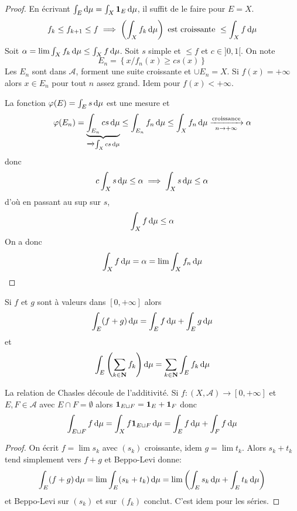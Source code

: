 \begin{proof}
    En écrivant $\int_E\mathop{}\!\mathrm d\mu=\int_X\bm{1}_E\mathop{}\!\mathrm d\mu$, il suffit de le faire pour  $E=X$.  \[
        f_k\leq f_{k+1}\leq f \implies \left( \int_X f_k\mathop{}\!\mathrm d\mu \right) \text{ est croissante  } \leq \int_Xf\mathop{}\!\mathrm d\mu
    \] 
    Soit $\alpha=\lim\int_Xf_k\mathop{}\!\mathrm d \mu\leq \int_X f\mathop{}\!\mathrm d \mu$. Soit $s$ simple et  $\leq f$ et $c \in  ]0,1[$. On note \[
        E_n = \left\{ x / f_n(x)\geq cs(x) \right\} 
    \] 
    Les $E_n$ sont dans  $\mathcal  A$, forment une suite croissante et $\cup E_n=X$. Si  $f(x)=+\infty$ alors $x \in  E_n$ pour tout $n$ assez grand. Idem pour $f(x)<+\infty$.

    La fonction  $\varphi(E)=\int_E s\mathop{}\!\mathrm d\mu$ est une mesure et  \[
        \varphi(E_n)=\underbrace{\int_{E_n}cs\mathop{}\!\mathrm d\mu}_{\xrightarrow{}\int_Xcs\mathop{}\!\mathrm d\mu}\leq \int_{E_n}f_n\mathop{}\!\mathrm d\mu\leq \int_X f_n\mathop{}\!\mathrm d\mu \xrightarrow[n\to +\infty]{\text{croissance}}\alpha
    \] 
    donc \[
    c\int_Xs\mathop{}\!\mathrm d \mu\leq \alpha \implies \int_Xs\mathop{}\!\mathrm d \mu\leq \alpha
    \]
    d'où en passant au sup sur $s$,  \[
    \int_Xf\mathop{}\!\mathrm d\mu\leq \alpha
    \]
    On a donc \[
    \int_Xf\mathop{}\!\mathrm d\mu = \alpha =\lim \int_X f_n\mathop{}\!\mathrm d\mu
    \] 
\end{proof}

\begin{cor}
    Si $f$ et  $g$ sont à valeurs dans  $[0, +\infty]$ alors  \[
        \int_E(f+g)\mathop{}\!\mathrm d \mu=\int_Ef\mathop{}\!\mathrm d\mu+\int_E g\mathop{}\!\mathrm d\mu
    \] 
    et \[
        \int_E \left(\sum_{k \in  \mathbf N} f_k\right)\mathop{}\!\mathrm d\mu=\sum_{k \in  \mathbf N}\int_Ef_k\mathop{}\!\mathrm d\mu
    \] 
\end{cor}

\begin{rem}
    La relation de Chasles découle de l'additivité. Si $f:(X, \mathcal  A) \longrightarrow [0, +\infty]$ et $E, F \in  \mathcal  A$ avec $E\cap F=\emptyset$ alors $\bm{1}_{E\sqcup F}=\bm{1}_E+\bm{1}_F$ donc \[
        \int_{E\sqcup F} f\mathop{}\!\mathrm d \mu=\int_X f\bm{1}_{E\sqcup F}\mathop{}\!\mathrm d \mu=\int_Ef\mathop{}\!\mathrm d \mu+\int_Ff\mathop{}\!\mathrm d\mu
    \]
\end{rem}

\begin{proof}
    On écrit $f=\lim s_k$ avec  $(s_k)$ croissante, idem $g=\lim t_k$.  Alors $s_k+t_k$ tend simplement vers  $f+g$ et Beppo-Levi donne:  \[
        \int_E(f+g)\mathop{}\!\mathrm d\mu=\lim\int_E(s_k+t_k)\mathop{}\!\mathrm d\mu=\lim \left(\int_Es_k\mathop{}\!\mathrm d \mu+\int_Et_k\mathop{}\!\mathrm d\mu\right)
    \] 
    et Beppo-Levi sur $(s_k)$ et sur  $(f_k)$ conclut. C'est idem pour les séries.
\end{proof}

